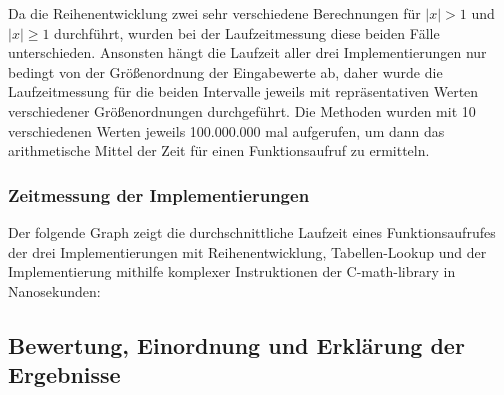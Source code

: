 \documentclass[course=erap] {aspdoc}
\begin{document}
    Da die Reihenentwicklung zwei sehr verschiedene Berechnungen für $|x|>1$ und $|x|\geq 1$ durchführt, wurden bei der Laufzeitmessung diese beiden Fälle unterschieden.
    Ansonsten hängt die Laufzeit aller drei Implementierungen nur bedingt von der Größenordnung der Eingabewerte ab, daher wurde die Laufzeitmessung für die beiden Intervalle jeweils mit repräsentativen Werten verschiedener Größenordnungen durchgeführt.
    Die Methoden wurden mit 10 verschiedenen Werten jeweils 100.000.000 mal aufgerufen, um dann das arithmetische Mittel der Zeit für einen Funktionsaufruf zu ermitteln.

    \subsubsection{Zeitmessung der Implementierungen}

    Der folgende Graph zeigt die durchschnittliche Laufzeit eines Funktionsaufrufes der drei Implementierungen mit Reihenentwicklung, Tabellen-Lookup und der Implementierung mithilfe komplexer Instruktionen der C-math-library in Nanosekunden:

 
     \subsection{Bewertung, Einordnung und Erklärung der Ergebnisse}
\end{document}
